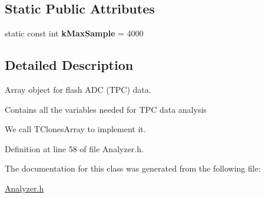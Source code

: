 \subsection*{Static Public Attributes}
\begin{DoxyCompactItemize}
\item 
\hypertarget{classTArtFadcHit_a85a64718db87fc04786a52d834ab51f2}{
static const int {\bfseries kMaxSample} = 4000}
\label{classTArtFadcHit_a85a64718db87fc04786a52d834ab51f2}

\end{DoxyCompactItemize}


\subsection{Detailed Description}
Array object for flash ADC (TPC) data. 

Contains all the variables needed for TPC data analysis\par
 We call TClonesArray to implement it. 

Definition at line 58 of file Analyzer.h.



The documentation for this class was generated from the following file:\begin{DoxyCompactItemize}
\item 
\hyperlink{Analyzer_8h}{Analyzer.h}\end{DoxyCompactItemize}
